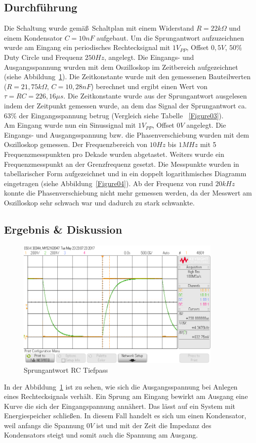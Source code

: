 \documentclass[12pt,a4paper,titlepage]{article}
\begin{document}
\subsection{Durchf\"uhrung}
Die Schaltung wurde gem\"a\ss\, Schaltplan mit einem Widerstand $R=22k\Omega$ und einem Kondensator $C=10nF$ aufgebaut. Um die Sprungantwort aufzuzeichnen wurde am Eingang ein periodisches Rechtecksignal mit $1 V_{PP}$, Offset $0,5 V$, $50 \%$ Duty Circle und Frequenz $250 Hz$, angelegt. Die Eingangs- und Ausgangsspannung wurden mit dem Oszilloskop im Zeitbereich aufgezeichnet (siehe Abbildung~\ref{Figure02}). Die Zeitkonstante wurde mit den gemessenen Bauteilwerten ($R=21,75 k\Omega$, $C=10,28nF$) berechnet und ergibt einen Wert von $\tau = RC = 226,16 \mu s$. Die Zeitkonstante wurde aus der Sprungantwort ausgelesen indem der Zeitpunkt gemessen wurde, an dem das Signal der Sprungantwort ca. $63 \%$ der Eingangsspannung betrug (Vergleich siehe Tabelle ~\ref{Figure03}). \\
Am Eingang wurde nun ein Sinussignal mit $1 V_{PP}$, Offset $0 V$ angelegt. Die Eingangs- und Ausgangsspannung bzw. die Phasenverschiebung wurden mit dem Oszilloskop gemessen. Der Frequenzbereich von $10Hz$ bis $1MHz$ mit 5 Frequenzmesspunkten pro Dekade wurden abgetastet. Weiters wurde ein Frequenzmesspunkt an der Grenzfrequenz gesetzt. Die Messpunkte wurden in tabellarischer Form aufgezeichnet und in ein doppelt logarithmisches Diagramm eingetragen (siehe Abbildung~\ref{Figure04}). Ab der Frequenz von rund $20kHz$ konnte die Phasenverschiebung nicht mehr gemessen werden, da der Messwert am Oszilloskop sehr schwach war und dadurch zu stark schwankte.

\subsection{Ergebnis \& Diskussion}
\begin{figure}[H]
  \centering
  \includegraphics[width=100mm]{sprungantwort_rc_tiefpass.png}
  \caption{Sprungantwort RC Tiefpass}
  \label{Figure02}
\end{figure}
\noindent In der Abbildung~\ref{Figure02} ist zu sehen, wie sich die Ausgangsspannung bei Anlegen eines Rechtecksignals verh\"alt. Ein Sprung am Eingang bewirkt am Ausgang eine Kurve die sich der Eingangspannung ann\"ahert. Das l\"asst auf ein System mit Energiespeicher schlie\ss en. In diesem Fall handelt es sich um einen Kondensator, weil anfangs die Spannung $0V$ ist und mit der Zeit die Impedanz des Kondensators steigt und somit auch die Spannung am Ausgang.
\end{document}
